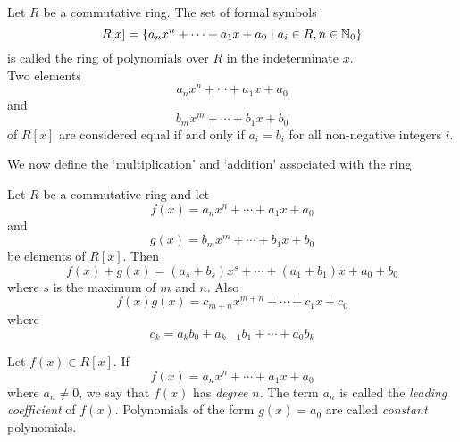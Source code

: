 \begin{definition}
	Let $R$ be a commutative ring. The set of formal symbols
	\begin{equation*}
		R[x] = \{a_nx^n+\cdots+a_1x+a_0\mid a_i\in R, n\in\mathbb{N}_0\}
	\end{equation*}
	is called the ring of polynomials over $R$ in the indeterminate $x$.\\
	Two elements 
	\begin{equation*}
		a_nx^n+\cdots+a_1x+a_0
	\end{equation*}
	and 
	\begin{equation*}
		b_mx^m +\cdots+b_1x+b_0 
	\end{equation*}
	of $R[x]$ are considered equal if and only if $a_i=b_i$ for all non-negative integers $i$.
\end{definition}

We now define the `multiplication' and `addition' associated with the ring
\begin{definition}
	Let $R$ be a commutative ring and let 
	\begin{equation*}
		f(x) = a_nx^n + \cdots + a_1x + a_0
	\end{equation*}
	and
	\begin{equation*}
		g(x) = b_mx^m + \cdots + b_1x + b_0
	\end{equation*}
	be elements of $R[x]$. Then
	\begin{equation*}
		f(x) + g(x) = (a_s+b_s)x^s + \cdots + (a_1+b_1)x + a_0+b_0
	\end{equation*}
	where $s$ is the maximum of $m$ and $n$. Also
	\begin{equation*}
		f(x)g(x) = c_{m+n}x^{m+n} + \cdots + c_1x + c_0
	\end{equation*}
	where
	\begin{equation*}
		c_k = a_kb_0 + a_{k-1}b_1 + \cdots + a_0b_k
	\end{equation*}
\end{definition}

\begin{definition}
	Let $f(x)\in R[x]$. If 
	\begin{equation*}
		f(x) = a_nx^n + \cdots + a_1x + a_0
	\end{equation*}
	where $a_n\ne0$, we say that $f(x)$ has \textit{degree} $n$. The term $a_n$ is called the \textit{leading coefficient} of $f(x)$. Polynomials of the form $g(x)=a_0$ are called \textit{constant} polynomials.
\end{definition}

